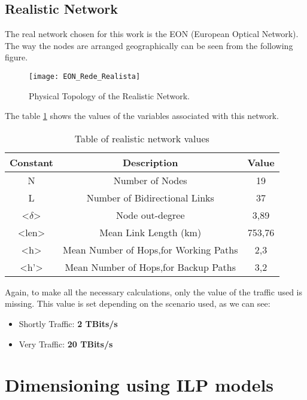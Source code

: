 \subsection{Realistic Network}
The real network chosen for this work is the EON (European Optical Network).
The way the nodes are arranged geographically can be seen from the following figure.
\vspace{100pt}

\begin{figure}[h!]
\centering
\texttt{[image: EON\_Rede\_Realista]}
\caption{Physical Topology of the Realistic Network.}
\end{figure}

The table \ref{table:2} shows the values of the variables associated with this network.
\begin{table}[h!]
\centering
\begin{tabular}{|| c | c | c||}
 \hline
 Constant & Description & Value \\
 \hline\hline
 N & Number of Nodes & 19 \\
 L & Number of Bidirectional Links & 37 \\
 <$\delta$> & Node out-degree & 3,89 \\
 <len> & Mean Link Length (km) & 753,76 \\
 <h> & Mean Number of Hops,for Working Paths & 2,3 \\
 <h'> & Mean Number of Hops,for Backup Paths & 3,2 \\
 \hline
\end{tabular}
\caption{Table of realistic network values}
\label{table:2}
\end{table}
\vspace{10pt}

Again, to make all the necessary calculations, only the value of the traffic used is missing. This value is set depending on the scenario used, as we can see:

\begin{itemize}
  \item Shortly Traffic: \textbf{2 TBits/s}
  \item Very Traffic: \textbf{20 TBits/s}
\end{itemize}
\vspace{10pt}

\section{Dimensioning using ILP models}

